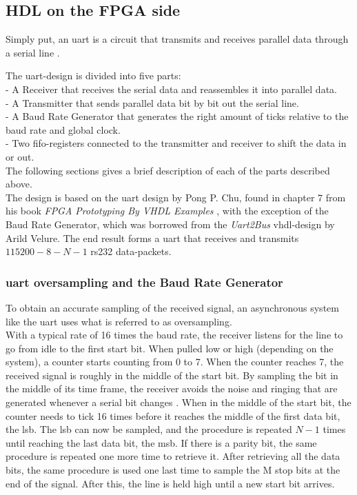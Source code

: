 \documentclass[main.tex]{subfiles}
\begin{document}
\subsection{HDL on the FPGA side}

Simply put, an \gls{uart} is a circuit that transmits and receives parallel data through a serial line \cite{chu08}.

The \gls{uart}-design is divided into five parts:\\
- A Receiver that receives the serial data and reassembles it into parallel data.\\
- A Transmitter that sends parallel data bit by bit out the serial line.\\
- A Baud Rate Generator that generates the right amount of ticks relative to the baud rate and global clock.\\
- Two \gls{fifo}-registers connected to the transmitter and receiver to shift the data in or out.\\

The following sections gives a brief description of each of the parts described above. \\
The design is based on the \gls{uart} design by Pong P. Chu, found in chapter 7 from his book \textit{FPGA Prototyping By VHDL Examples}  \cite{chu08}, with the exception of the Baud Rate Generator, which was borrowed from the \textit{Uart2Bus} \acrshort{vhdl}-design by Arild Velure. The end result forms a \gls{uart} that receives and transmits $115200-8-N-1$ \gls{rs232} data-packets.

\subsubsection{\gls{uart} oversampling and the Baud Rate Generator}

To obtain an accurate sampling of the received signal, an asynchronous system like the \gls{uart} uses what is referred to as oversampling. \\
With a typical rate of 16 times the baud rate, the receiver listens for the line to go from idle to the first start bit. When pulled low or high (depending on the system), a counter starts counting from 0 to 7. When the counter reaches 7, the received signal is roughly in the middle of the start bit. By sampling the bit in the middle of its time frame, the receiver avoids the noise and ringing that are generated whenever a serial bit changes \cite{rapid08}. When in the middle of the start bit, the counter needs to tick 16 times before it reaches the middle of the first data bit, the \gls{lsb}. The \gls{lsb} can now be sampled, and the procedure is repeated $N - 1$ times until reaching the last data bit, the \acrshort{msb}. If there is a parity bit, the same procedure is repeated one more time to retrieve it. After retrieving all the data bits, the same procedure is used one last time to sample the M stop bits at the end of the signal. After this, the line is held high until a new start bit arrives. 
\end{document}
